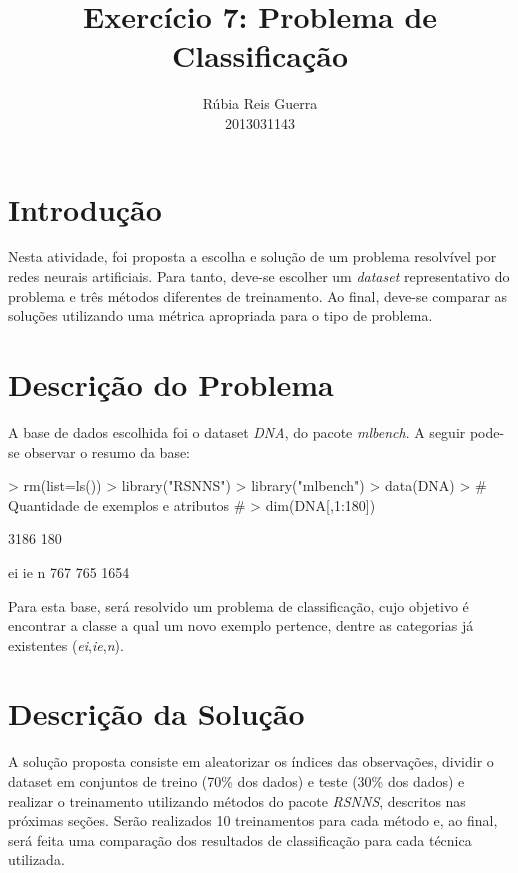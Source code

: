 \documentclass{article}
\title{Exercício 7: Problema de Classificação}
\author{Rúbia Reis Guerra \\ 2013031143}
\begin{document}


\maketitle

\section{Introdução}
Nesta atividade, foi proposta a escolha e solução de um problema resolvível por redes neurais artificiais. Para tanto, deve-se escolher um \textit{dataset} representativo do problema e três métodos diferentes de treinamento. Ao final, deve-se comparar as soluções utilizando uma métrica apropriada para o tipo de problema.

\section{Descrição do Problema}
A base de dados escolhida foi o dataset \textit{DNA}, do pacote \textit{mlbench}. A seguir pode-se observar o resumo da base:
\begin{Schunk}
\begin{Sinput}
> rm(list=ls())
> library("RSNNS")
> library("mlbench")
> data(DNA)
> # Quantidade de exemplos e atributos #
> dim(DNA[,1:180])
\end{Sinput}
\begin{Soutput}
[1] 3186  180
\end{Soutput}
\begin{Soutput}
  ei   ie    n 
 767  765 1654 
\end{Soutput}
\end{Schunk}
Para esta base, será resolvido um problema de classificação, cujo objetivo é encontrar a classe a qual um novo exemplo pertence, dentre as categorias já existentes (\textit{ei},\textit{ie},\textit{n}).

\section{Descrição da Solução}
A solução proposta consiste em aleatorizar os índices das observações, dividir o dataset em conjuntos de treino (70\% dos dados) e teste (30\% dos dados) e realizar o treinamento utilizando métodos do pacote \textit{RSNNS}, descritos nas próximas seções. Serão realizados 10 treinamentos para cada método e, ao final, será feita uma comparação dos resultados de classificação para cada técnica utilizada.
\end{document}
